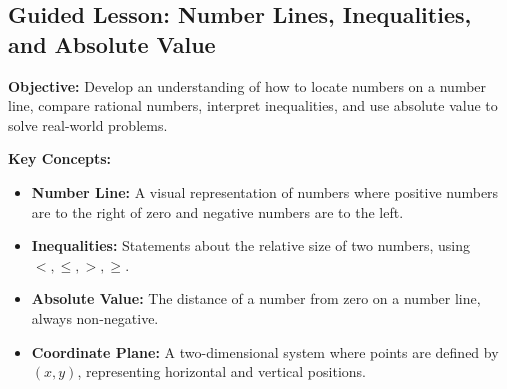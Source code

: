 \documentclass[12pt]{article}
\title{}
\date{}
\begin{document}
\subsection*{Guided Lesson: Number Lines, Inequalities, and Absolute Value}
\onehalfspacing

\begin{tcolorbox}[colframe=black!40, colback=gray!5, 
coltitle=black, colbacktitle=black!20, fonttitle=\bfseries\Large, 
title=Learning Objective, halign title=center, left=5pt, right=5pt, top=5pt, bottom=15pt]
\textbf{Objective:} Develop an understanding of how to locate numbers on a number line, compare rational numbers, interpret inequalities, and use absolute value to solve real-world problems.
\end{tcolorbox}

\begin{tcolorbox}[colframe=black!60, colback=white, 
coltitle=black, colbacktitle=black!15, fonttitle=\bfseries\Large, 
title=Key Concepts and Vocabulary, halign title=center, left=10pt, right=10pt, top=10pt, bottom=15pt]
\textbf{Key Concepts:}
\begin{itemize}
    \item \textbf{Number Line:} A visual representation of numbers where positive numbers are to the right of zero and negative numbers are to the left.
    \item \textbf{Inequalities:} Statements about the relative size of two numbers, using \( <, \leq, >, \geq \).
    \item \textbf{Absolute Value:} The distance of a number from zero on a number line, always non-negative.
    \item \textbf{Coordinate Plane:} A two-dimensional system where points are defined by \( (x, y) \), representing horizontal and vertical positions.
\end{itemize}
\end{tcolorbox}
\end{document}
